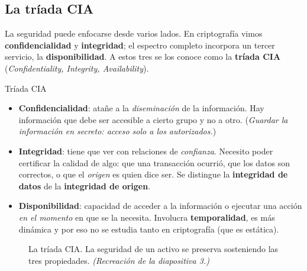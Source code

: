 \documentclass[11pt,a4paper]{article}
\begin{document}
\subsection{La tríada CIA}
La seguridad puede enfocarse desde varios lados. En criptografía vimos
\textbf{confidencialidad} y \textbf{integridad}; el espectro completo incorpora un tercer
servicio, la \textbf{disponibilidad}. A estos tres se los conoce como la \textbf{tríada CIA}
(\emph{Confidentiality, Integrity, Availability}).

\begin{defbox}{Tríada CIA}
\begin{itemize}[leftmargin=1.5em,itemsep=2pt]
  \item \textbf{Confidencialidad}: atañe a la \emph{diseminación} de la información. Hay
        información que debe ser accesible a cierto grupo y no a otro. (\emph{Guardar la
        información en secreto: acceso solo a los autorizados.})
  \item \textbf{Integridad}: tiene que ver con relaciones de \emph{confianza}. Necesito poder
        certificar la calidad de algo: que una transacción ocurrió, que los datos son
        correctos, o que el \emph{origen} es quien dice ser. Se distingue la
        \textbf{integridad de datos} de la \textbf{integridad de origen}.
  \item \textbf{Disponibilidad}: capacidad de acceder a la información o ejecutar una acción
        \emph{en el momento} en que se la necesita. Involucra \textbf{temporalidad}, es más
        dinámica y por eso no se estudia tanto en criptografía (que es estática).
\end{itemize}
\end{defbox}

\begin{figure}[h]
\centering
{}
\caption{La tríada CIA. La seguridad de un activo se preserva sosteniendo las tres
propiedades. \textit{(Recreación de la diapositiva 3.)}}
\end{figure}
\end{document}
